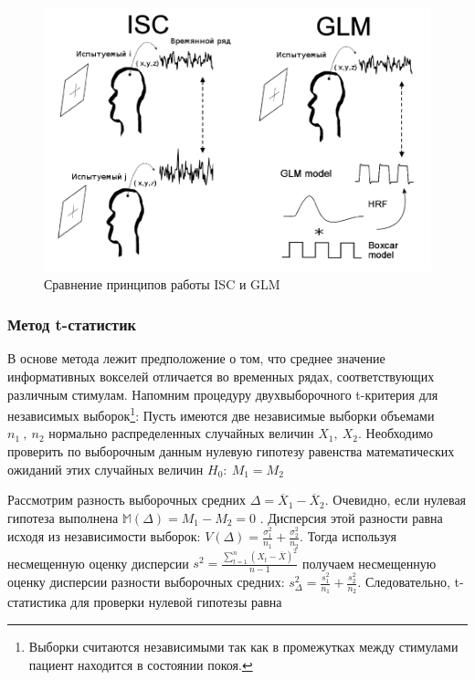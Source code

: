 \begin{figure}%
	\begin{center}
		\includegraphics[width=.8\columnwidth]{./img/iscvsGLM.png}%
	\end{center}
	\caption{Сравнение принципов работы ISC и GLM}%
	\label{pic:iscvsglm}%
\end{figure}



\subsubsection*{Метод t-статистик}
В основе метода лежит предположение о том, что среднее значение информативных вокселей отличается 
во временных рядах, соответствующих различным стимулам. Напомним процедуру двухвыборочного t-критерия для независимых выборок\footnote{Выборки считаются независимыми так как в промежутках между стимулами пациент находится в состоянии покоя.}:
Пусть имеются две независимые выборки объемами ${\displaystyle n_{1}~,~n_{2}}$ нормально распределенных случайных величин ${\displaystyle X_{1},~X_{2}}$. Необходимо проверить по выборочным данным нулевую гипотезу равенства математических ожиданий этих случайных величин ${\displaystyle H_{0}:~M_{1}=M_{2}}$

Рассмотрим разность выборочных средних ${\displaystyle \Delta ={\overline {X}}_{1}-{\overline {X}}_{2}}$. Очевидно, если нулевая гипотеза выполнена ${\displaystyle \mathbb{M}(\Delta )=M_{1}-M_{2}=0}$ . Дисперсия этой разности равна исходя из независимости выборок: ${\displaystyle V(\Delta )={\frac {\sigma _{1}^{2}}{n_{1}}}+{\frac {\sigma _{2}^{2}}{n_{2}}}}$. Тогда используя несмещенную оценку дисперсии ${\displaystyle s^{2}={\frac {\sum _{t=1}^{n}(X_{t}-{\overline {X}})^{2}}{n-1}}}$  получаем несмещенную оценку дисперсии разности выборочных средних: ${\displaystyle s_{\Delta }^{2}={\frac {s_{1}^{2}}{n_{1}}}+{\frac {s_{2}^{2}}{n_{2}}}}$. Следовательно, t-статистика для проверки нулевой гипотезы равна

